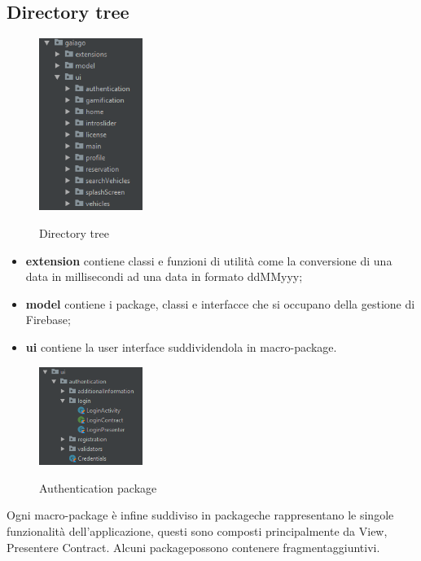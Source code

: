 \subsection{Directory tree}
\begin{figure}[H]
	\centering
	\includegraphics[width=0.3\textwidth]
	{res/images/directorytree.png}\\
	\caption{Directory tree}
	\label{Directory Tree}
\end{figure}
\begin{itemize}
	\item \textbf{extension} contiene classi e funzioni di utilità come la conversione di una data in millisecondi ad una data in formato ddMMyyy;
	\item \textbf{model} contiene i package\glo, classi e interfacce che si occupano della gestione di Firebase\glo;
	\item \textbf{ui} contiene la user interface suddividendola in macro-package.
\end{itemize}
\begin{figure}[H]
	\centering
	\includegraphics[width=0.3\textwidth]
	{res/images/authentication.png}\\
	\caption{Authentication package}
	\label{Authentication package}
\end{figure}
Ogni macro-package è infine suddiviso in package\glosp che rappresentano le singole funzionalità dell'applicazione, questi sono composti principalmente da View\glosp, Presenter\glosp e Contract\glosp. Alcuni package\glosp possono contenere fragment\glosp aggiuntivi.